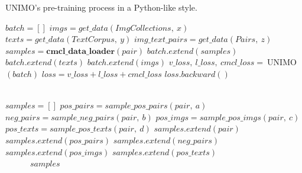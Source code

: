 \documentclass[11pt,a4paper]{article}
\begin{document}
\begin{algorithm}[t!]  
	\caption{UNIMO's pre-training process in a Python-like style.}  
	\label{alg:cmcl-pseudocode} 
	\begin{algorithmic}
	\small{
\State {}
		\State $batch = []$
		\State {}
		\State $imgs = get\_data(ImgCollections,\ x)$
		\State {}
		\State $texts = get\_data(TextCorpus,\ y)$
		\State {}
		\State $img\_text\_pairs = get\_data(Pairs,\ z)$
		\State {}
		\State$samples = \mathbf{cmcl\_data\_loader}(pair)$
		\State$batch.extend(samples)$
		\EndFor
		\State$batch.extend(texts)$
		\State$batch.extend(imgs)$
		\State $v\_loss,\ l\_loss,\ cmcl\_loss =\ $UNIMO$(batch)$
		\State$loss=v\_loss+ l\_loss+ cmcl\_loss$
		\State$loss.backward()$
		\EndFor
		\EndFunction
		
		\\
		\State {}
		\State $samples = []$
		\State {}
		\State$pos\_pairs = sample\_pos\_pairs(pair,\ a)$
		\State {}
		\State$neg\_pairs = sample\_neg\_pairs(pair,\ b)$
		\State {}
		\State$pos\_imgs = sample\_pos\_imgs(pair,\ c)$
		\State {}
		\State$pos\_texts = sample\_pos\_texts(pair,\ d)$
		\State $samples.extend(pair)$
		\State $samples.extend(pos\_pairs)$
		\State $samples.extend(neg\_pairs)$
		\State $samples.extend(pos\_imgs)$
		\State $samples.extend(pos\_texts)$
		\\ \ \ \ \ \ \ \Return $samples$
		\EndFunction
	}
	\end{algorithmic}  
\end{algorithm}
\end{document}

